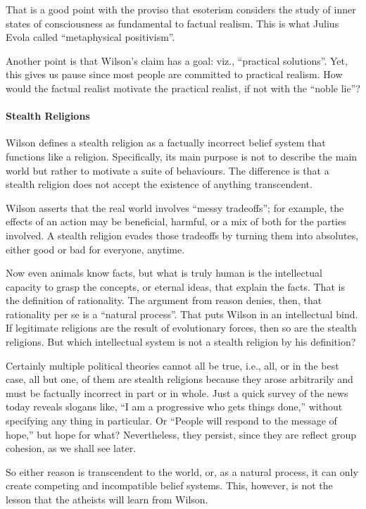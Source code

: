 That is a good point with the proviso that esoterism considers the study of inner states of consciousness as fundamental to factual realism. This is what Julius Evola called ``metaphysical positivism''.

Another point is that Wilson's claim has a goal: viz., ``practical solutions''. Yet, this gives us pause since most people are committed to practical realism. How would the factual realist motivate the practical realist, if not with the ``noble lie''?

\paragraph{Stealth Religions}


Wilson defines a stealth religion as a factually incorrect belief system that functions like a religion. Specifically, its main purpose is not to describe the main world but rather to motivate a suite of behaviours. The difference is that a stealth religion does not accept the existence of anything transcendent.

Wilson asserts that the real world involves ``messy tradeoffs''; for example, the effects of an action may be beneficial, harmful, or a mix of both for the parties involved. A stealth religion evades those tradeoffs by turning them into absolutes, either good or bad for everyone, anytime.

Now even animals know facts, but what is truly human is the intellectual capacity to grasp the concepts, or eternal ideas, that explain the facts. That is the definition of rationality. The argument from reason denies, then, that rationality per se is a ``natural process''. That puts Wilson in an intellectual bind. If legitimate religions are the result of evolutionary forces, then so are the stealth religions. But which intellectual system is not a stealth religion by his definition?

Certainly multiple political theories cannot all be true, i.e., all, or in the best case, all but one, of them are stealth religions because they arose arbitrarily and must be factually incorrect in part or in whole. Just a quick survey of the news today reveals slogans like, ``I am a progressive who gets things done,'' without specifying any thing in particular. Or ``People will respond to the message of hope,'' but hope for what? Nevertheless, they persist, since they are reflect group cohesion, as we shall see later.

So either reason is transcendent to the world, or, as a natural process, it can only create competing and incompatible belief systems. This, however, is not the lesson that the atheists will learn from Wilson.

